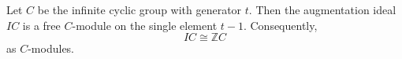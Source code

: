 Let $C$ be the infinite cyclic group with generator $t$. Then the augmentation ideal $IC$ is a free $C$-module on the single element $t - 1$. Consequently,
$$IC \cong \mathbb{Z}C$$
as $C$-modules.
